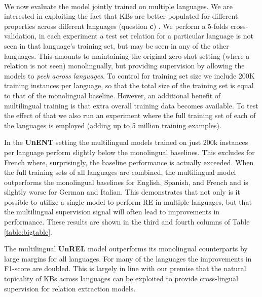 \paragraph{}
We now evaluate the model jointly trained on multiple languages. We are interested in exploiting the fact that KBs are better populated for different properties across different languages (question \textbf{c})
. We perform a 5-folds cross-validation, in each experiment a test set relation for a particular language is not seen in that language's training set, but may be seen in any of the other languages. This amounts to maintaining the original zero-shot setting (where a relation is not seen) monolingually, but providing supervision by allowing the models to \textit{peek across languages}.  To control for training set size we include 200K training instances per language, so that the total size of the training set is equal to that of the monolingual baseline. However, an additional benefit of multilingual training is that extra overall training data becomes available. To test the effect of that we also run an experiment where the full training set of each of the languages is employed (adding up to 5 million training examples).

In the \textbf{UnENT} setting the multilingual models trained on just 200k instances per language perform slightly below the monolingual baselines. This excludes for French where, surprisingly, the baseline performance is actually exceeded. When the full training sets of all languages are combined, the multilingual model outperforms the monolingual baselines for English, Spanish, and French and is slightly worse for German and Italian. This demonstrates that not only is it possible to utilize a single model to perform RE in multiple languages, but that the multilingual supervision signal will often lead to improvements in performance. These results are shown in the third and fourth columns of Table \ref{table:bigtable}. 

The multilingual \textbf{UnREL} model outperforms its monolingual counterparts by large margins for all languages. For many of the languages the improvements in F1-score are doubled.
This is largely in line with our premise that the natural topicality of KBs across languages can be exploited to provide cross-lingual supervision for relation extraction models. 


